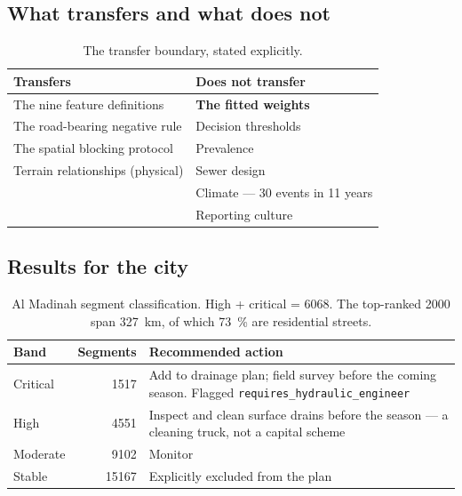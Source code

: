 \documentclass[11pt,a4paper]{article}
\newcommand{\ttt}[1]{\texttt{#1}}
\begin{document}
\subsection{What transfers and what does not}

\begin{table}[htbp]\centering\small
\caption{The transfer boundary, stated explicitly.}\label{tab:boundary}
\begin{tabular}{@{}p{6.0cm}p{6.4cm}@{}}
\toprule
\textbf{Transfers} & \textbf{Does not transfer}\\
\midrule
The nine feature definitions & \textbf{The fitted weights}\\
The road-bearing negative rule & Decision thresholds\\
The spatial blocking protocol & Prevalence\\
Terrain relationships (physical) & Sewer design\\
 & Climate --- 30 events in 11 years\\
 & Reporting culture\\
\bottomrule
\end{tabular}
\end{table}

\subsection{Results for the city}

\begin{table}[htbp]\centering\small
\caption{Al Madinah segment classification. High + critical = \num{6068}. The top-ranked
\num{2000} span \SI{327}{\kilo\metre}, of which \SI{73}{\percent} are residential
streets.}\label{tab:bands}
\begin{tabular}{@{}lrp{7.2cm}@{}}
\toprule
Band & Segments & Recommended action\\
\midrule
\rowcolor{rowtint}
Critical & \num{1517} & Add to drainage plan; field survey before the coming season.
  Flagged \ttt{requires\_hydraulic\_engineer}\\
\rowcolor{rowtint}
High & \num{4551} & Inspect and clean surface drains before the season --- a cleaning
  truck, not a capital scheme\\
Moderate & \num{9102} & Monitor\\
Stable & \num{15167} & Explicitly excluded from the plan\\
\bottomrule
\end{tabular}
\end{table}
\end{document}
